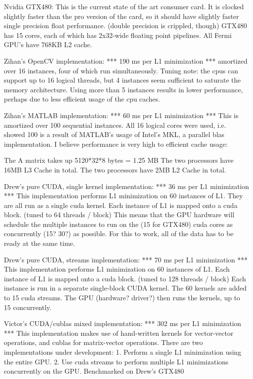 \documentclass[10pt,twocolumn,letterpaper]{article}
\begin{document}
Nvidia GTX480: This is the current state of the art consumer card.  
It is clocked slightly faster than the pro version of the card, so it 
should have slightly faster single precision float performance. (double precision is crippled, though)
GTX480 has 15 cores, each of which has 2x32-wide floating point pipelines.
All Fermi GPU's have 768KB L2 cache.

Zihan's OpenCV implementation: *** 190 ms per L1 minimization ***
amortized over 16 instances,
four of which run simultaneously.  Tuning note:  the cpus
can support up to 16 logical threads, but 4 instances seem
sufficient to saturate the memory architecture.  Using more
than 5 instances results in lower performance, perhaps due
to less efficient usage of the cpu caches.

Zihan's MATLAB implementation: *** 60 ms per L1 minimization ***
This is amortized over 100 sequential instances.  All 16 logical
cores were used, i.e. showed 100%
is a result of MATLAB's usage of Intel's MKL, a parallel blas
implementation. I believe performance is very high to
efficient cache usage:

The A matrix takes up 5120*32*8 bytes = 1.25 MB
The two processors have 16MB L3 Cache in total.
The two processors have 2MB L2 Cache in total.

Drew's pure CUDA, single kernel implementation: *** 36 ms per L1 minimization ***
This implementation performs L1 minimization on 60 instances of L1.
They are all run as a single cuda kernel.  
Each instance of L1 is mapped onto a cuda block. (tuned to 64 threads / block)
This means that the GPU hardware will schedule the multiple instances to run
on the (15 for GTX480) cuda cores as concurrently (15? 30?) as possible.  
For this to work, all of the data has to be ready at the same time.

Drew's pure CUDA, streams implementation: *** 70 ms per L1 minimization ***
This implementation performs L1 minimization on 60 instances of L1.
Each instance of L1 is mapped onto a cuda block. (tuned to 128 threads / block)
Each instance is run in a separate single-block CUDA kernel.
The 60 kernels are added to 15 cuda streams.
The GPU (hardware? driver?) then runs the kernels, up to 15 concurrently.

Victor's CUDA/cublas mixed implementation: *** 302 ms per L1 minimization ***
This implementation makes use of hand-written kernels for vector-vector operations,
and cublas for matrix-vector operations.  There are two implementations under development:
1. Perform a single L1 minimization using the entire GPU.
2. Use cuda streams to perform multiple L1 minimizations concurrently on the GPU.
Benchmarked on Drew's GTX480
\end{document}

